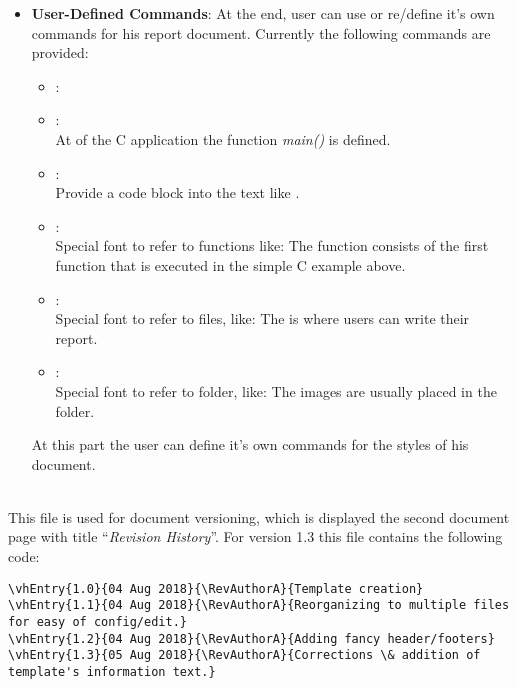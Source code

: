 \begin{description}
\begin{itemize}
\begin{lstlisting}
int main(int argc, char** argv) {
	printf("Hello World!\n");
	return 0;
}
\end{lstlisting}
\item{\textbf{User-Defined Commands}}: At the end, user can use or re/define it's own commands for his report document. Currently the following commands are provided:
\begin{itemize}
\item{\codemr{\\rednote\{\}}:\\ }
\item{\codemr{\\codeline\{\}}:\\ At  of the C application the function \textit{main()} is defined.}
\item{\codemr{\\codemr\{\}}:\\ Provide a code block into the text like }.
\item{\codemr{\\functionname\{\}}:\\ Special font to refer to functions like: The function  consists of the first function that is executed in the simple C example above.}
\item{\codemr{\\filename\{\}}:\\ Special font to refer to files, like: The  is where users can write their report.}
\item{\codemr{\\foldername\{\}}:\\ Special font to refer to folder, like: The images are usually placed in the  folder.}
\end{itemize}
At this part the user can define it's own commands for the styles of his document.
\end{itemize}



\item{\textbf{}} \hfill \\
This file is used for document versioning, which is displayed the second document page with title ``\textit{Revision History}''. For version 1.3 this file contains the following code:
\lstset{language=TeX}
\begin{lstlisting}
\vhEntry{1.0}{04 Aug 2018}{\RevAuthorA}{Template creation}
\vhEntry{1.1}{04 Aug 2018}{\RevAuthorA}{Reorganizing to multiple files for easy of config/edit.}
\vhEntry{1.2}{04 Aug 2018}{\RevAuthorA}{Adding fancy header/footers}
\vhEntry{1.3}{05 Aug 2018}{\RevAuthorA}{Corrections \& addition of template's information text.}
\end{lstlisting}




\end{description}
